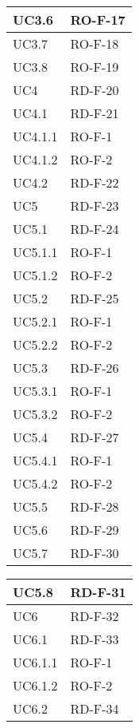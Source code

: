 \begin{center}
\begin{tabular}{ |m{8em}|m{13em}| }
    \hline
    UC3.6       &   RO-F-17 \\
    \hline
    UC3.7       &   RO-F-18 \\
    \hline
    UC3.8       &   RO-F-19 \\
    \hline
    UC4         &   RD-F-20 \\
    \hline
    UC4.1       &   RD-F-21 \\
    \hline
    UC4.1.1     &   RO-F-1 \\
    \hline
    UC4.1.2     &   RO-F-2 \\
    \hline
    UC4.2       &   RD-F-22 \\
    \hline
    UC5         &   RD-F-23 \\
    \hline
    UC5.1       &   RD-F-24 \\
    \hline
    UC5.1.1     &   RO-F-1 \\
    \hline
    UC5.1.2     &   RO-F-2 \\
    \hline
    UC5.2       &   RD-F-25 \\
    \hline
    UC5.2.1     &   RO-F-1 \\
    \hline
    UC5.2.2     &   RO-F-2 \\
    \hline
    UC5.3       &   RD-F-26 \\
    \hline
    UC5.3.1     &   RO-F-1 \\
    \hline
    UC5.3.2     &   RO-F-2 \\
    \hline
    UC5.4       &   RD-F-27 \\
    \hline
    UC5.4.1     &   RO-F-1 \\
    \hline
    UC5.4.2     &   RO-F-2 \\
    \hline
    UC5.5       &   RD-F-28 \\
    \hline
    UC5.6       &   RD-F-29 \\
    \hline
    UC5.7       &   RD-F-30 \\
    \hline
    \end{tabular}
    \newpage
    \begin{tabular}{ |m{8em}|m{13em}| }
    \hline
    UC5.8       &   RD-F-31 \\
    \hline
    UC6         &   RD-F-32 \\
    \hline
    UC6.1       &   RD-F-33 \\
    \hline
    UC6.1.1     &   RO-F-1 \\
    \hline
    UC6.1.2     &   RO-F-2 \\
    \hline
    UC6.2       &   RD-F-34 \\

\end{tabular}
\end{center}
